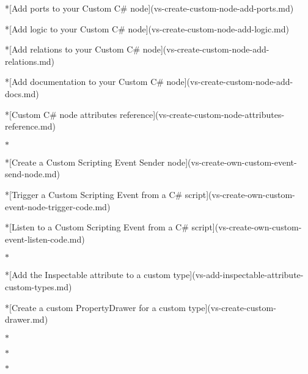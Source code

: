 \begin{DoxyItemize}
\begin{DoxyVerb}
*[Add ports to your Custom C# node](vs-create-custom-node-add-ports.md)

*[Add logic to your Custom C# node](vs-create-custom-node-add-logic.md)

*[Add relations to your Custom C# node](vs-create-custom-node-add-relations.md)

*[Add documentation to your Custom C# node](vs-create-custom-node-add-docs.md)

*[Custom C# node attributes reference](vs-create-custom-node-attributes-reference.md)
\end{DoxyVerb}
 \texorpdfstring{$\ast$}{*} \begin{DoxyVerb}*[Create a Custom Scripting Event Sender node](vs-create-own-custom-event-send-node.md)

*[Trigger a Custom Scripting Event from a C# script](vs-create-own-custom-event-node-trigger-code.md)

*[Listen to a Custom Scripting Event from a C# script](vs-create-own-custom-event-listen-code.md)
\end{DoxyVerb}
 \texorpdfstring{$\ast$}{*} \begin{DoxyVerb}*[Add the Inspectable attribute to a custom type](vs-add-inspectable-attribute-custom-types.md)

*[Create a custom PropertyDrawer for a custom type](vs-create-custom-drawer.md)
\end{DoxyVerb}

\item {}

\texorpdfstring{$\ast$}{*}

\texorpdfstring{$\ast$}{*}

\texorpdfstring{$\ast$}{*}


\end{DoxyItemize}
